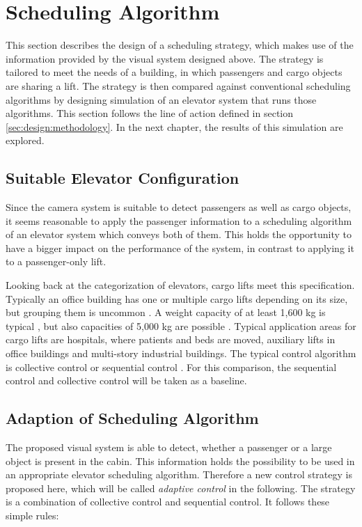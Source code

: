\section{Scheduling Algorithm}
This section describes the design of a scheduling strategy, 
which makes use of the information provided by the visual system designed above.
The strategy is tailored to meet the needs of a building, in which passengers and cargo objects are sharing a lift.
The strategy is then compared against conventional scheduling algorithms by designing  simulation of an elevator system that runs those algorithms.
This section follows the line of action defined in section \ref{sec:design:methodology}.
In the next chapter, the results of this simulation are explored.

\subsection{Suitable Elevator Configuration}
Since the camera system is suitable to detect passengers as well as cargo objects,
it seems reasonable to apply the passenger information 
to a scheduling algorithm of an elevator system which conveys both of them.
This holds the opportunity to have a bigger impact on the performance of the system, 
in contrast to applying it to a passenger-only lift.

Looking back at the categorization of elevators, cargo lifts meet this specification.
Typically an office building has one or multiple cargo lifts depending on its size,
but grouping them is uncommon \autocite[][p.~167]{barney2016handbook}.
A weight capacity of at least 1,600 kg is typical \autocite[][p.~167]{barney2016handbook},
but also capacities of 5,000 kg are possible \autocite[][]{kone2017overview}.
Typical application areas for cargo lifts are hospitals, where patients and beds are moved,
auxiliary lifts in office buildings and multi-story industrial buildings.
The typical control algorithm is collective control or sequential control \autocite[][pp.~238,~244]{barney2016handbook}.
For this comparison, the sequential control and collective control will be taken as a baseline.

\subsection{Adaption of Scheduling Algorithm}
The proposed visual system is able to detect, whether a passenger or a large object is present in the cabin.
This information holds the possibility to be used in an appropriate elevator scheduling algorithm.
Therefore a new control strategy is proposed here, which will be called \emph{adaptive control} in the following. 
The strategy is a combination of collective control and sequential control.
It follows these simple rules:

